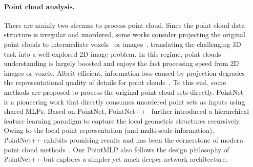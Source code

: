 \documentclass{article} \usepackage{iclr2022_conference,times}
\begin{document}
\paragraph{Point cloud analysis.} There are mainly two streams to process point cloud. 
Since the point cloud data structure is irregular and unordered, some works consider projecting the original point clouds to intermediate voxels~\citep{maturana2015voxnet,shi2020pv} or images~\citep{you2018pvnet,li2020end}, translating the challenging 3D task into a well-explored 2D image problem. In this regime, point clouds understanding is largely boosted and enjoys the fast processing speed from 2D images or voxels. Albeit efficient, information loss caused by projection degrades the representational quality of details for point clouds~\citep{yang2019std}. To this end, some methods are proposed to process the original point cloud sets directly. PointNet~\citep{qi2017pointnet} is a pioneering work that directly consumes unordered point sets as inputs using shared MLPs. Based on PointNet, PointNet++~\citep{qi2017pointnet++} further introduced a hierarchical feature learning paradigm to capture the local geometric structures recursively. Owing to the local point representation (and multi-scale information), PointNet++ exhibits promising results and has been the cornerstone of modern point cloud methods~\citep{wang2019dynamic,fan2021scf,xu2021paconv}. Our PointMLP also follows the design philosophy of PointNet++ but explores a simpler yet much deeper network architecture.
\end{document}
